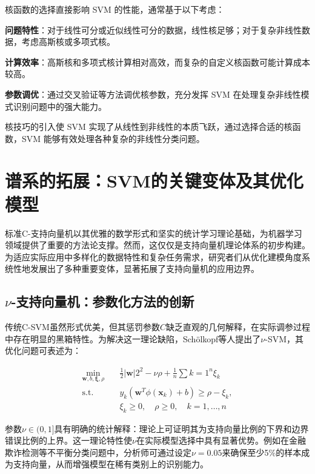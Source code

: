 \documentclass{article}
\newenvironment{solution_cn}{%
  \begin{proof}[解答]%
}{%
  \end{proof}%
}
\begin{document}
\begin{solution_cn}
核函数的选择直接影响 SVM 的性能，通常基于以下考虑：

\textbf{问题特性}：对于线性可分或近似线性可分的数据，线性核足够；对于复杂非线性数据，考虑高斯核或多项式核。

\textbf{计算效率}：高斯核和多项式核计算相对高效，而复杂的自定义核函数可能计算成本较高。

\textbf{参数调优}：通过交叉验证等方法调优核参数，充分发挥 SVM 在处理复杂非线性模式识别问题中的强大能力。

核技巧的引入使 SVM 实现了从线性到非线性的本质飞跃，通过选择合适的核函数，SVM 能够有效处理各种复杂的非线性分类问题。


\section{谱系的拓展：SVM的关键变体及其优化模型}

标准C-支持向量机以其优雅的数学形式和坚实的统计学习理论基础，为机器学习领域提供了重要的方法论支撑。然而，这仅仅是支持向量机理论体系的初步构建。为适应实际应用中多样化的数据特性和复杂任务需求，研究者们从优化建模角度系统性地发展出了多种重要变体，显著拓展了支持向量机的应用边界。

\subsection{$\nu$-支持向量机：参数化方法的创新}

传统C-SVM虽然形式优美，但其惩罚参数$C$缺乏直观的几何解释，在实际调参过程中存在明显的黑箱特性。为解决这一理论缺陷，Schölkopf等人提出了$\nu$-SVM，其优化问题可表述为：

\begin{equation}
\begin{split}
\min_{\boldsymbol{w},b,\boldsymbol{\xi},\rho} \quad & \frac{1}{2} |\boldsymbol{w}|2^2 - \nu \rho + \frac{1}{n} \sum{k=1}^{n} \xi_k \\
\text{s.t.} \quad & y_k (\boldsymbol{w}^T \phi(\boldsymbol{x}_k) + b) \geq \rho - \xi_k, \\
& \xi_k \geq 0, \quad \rho \geq 0, \quad k=1,\ldots,n
\end{split}
\end{equation}

参数$\nu \in (0,1]$具有明确的统计解释：理论上可证明其为支持向量比例的下界和边界错误比例的上界。这一理论特性使$\nu$在实际模型选择中具有显著优势。例如在金融欺诈检测等不平衡分类问题中，分析师可通过设定$\nu=0.05$来确保至少5\%的样本成为支持向量，从而增强模型在稀有类别上的识别能力。


\end{solution_cn}
\end{document}
